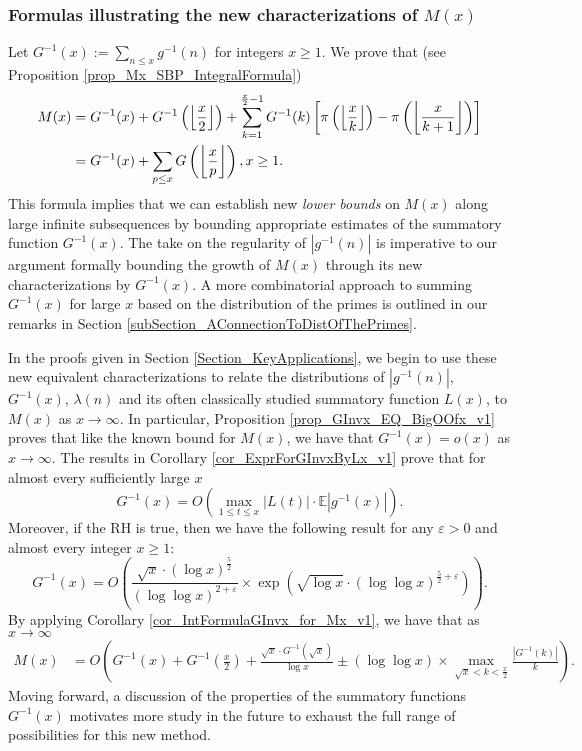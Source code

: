 \documentclass[11pt,reqno,a4letter]{article}
\numberwithin{figure}{section}
\numberwithin{table}{section}
\newcommand{\Floor}[2]{\ensuremath{\left\lfloor \frac{#1}{#2} \right\rfloor}}
\theoremstyle{plain}
\numberwithin{theorem}{section}
\theoremstyle{definition}
\begin{document}
\subsubsection{Formulas illustrating the new characterizations of $M(x)$} 

Let $G^{-1}(x) := \sum_{n \leq x} g^{-1}(n)$ for integers $x \geq 1$. 
We prove that (see Proposition \ref{prop_Mx_SBP_IntegralFormula}) 
\begin{align} 
\label{eqn_Mx_gInvnPixk_formula_v2} 
M(x) & = G^{-1}(x) + G^{-1}\left(\Floor{x}{2}\right) + 
     \sum_{k=1}^{\frac{x}{2}-1} G^{-1}(k) \left[ 
     \pi\left(\Floor{x}{k}\right) - \pi\left(\Floor{x}{k+1}\right) 
     \right] \\ 
\notag
     & = 
     G^{-1}(x) + \sum_{p \leq x} G\left(\Floor{x}{p}\right), x \geq 1. 
\end{align} 
This formula 
implies that we can establish new \emph{lower bounds} on $M(x)$ along large infinite subsequences 
by bounding appropriate estimates of the summatory function $G^{-1}(x)$. 
The take on the regularity of $|g^{-1}(n)|$ is imperative to our argument formally bounding the growth 
of $M(x)$ through its new characterizations by $G^{-1}(x)$. 
A more combinatorial approach to summing $G^{-1}(x)$ for large $x$ based on the distribution of the primes 
is outlined in our remarks in Section \ref{subSection_AConnectionToDistOfThePrimes}. 

In the proofs given in 
Section \ref{Section_KeyApplications}, 
we begin to use these new equivalent characterizations to relate the distributions of 
$|g^{-1}(n)|$, $G^{-1}(x)$, $\lambda(n)$ and its often classically studied summatory function $L(x)$, 
to $M(x)$ as $x \rightarrow \infty$. 
In particular, Proposition \ref{prop_GInvx_EQ_BigOOfx_v1} 
proves that like the known bound for $M(x)$, we have that $G^{-1}(x) = o(x)$ as $x \rightarrow \infty$. 
The results in 
Corollary \ref{cor_ExprForGInvxByLx_v1} prove that for almost every sufficiently large $x$ 
\[
G^{-1}(x) = O\left(\max_{1 \leq t \leq x} |L(t)| \cdot \mathbb{E}|g^{-1}(x)|\right). 
\]
Moreover, if the RH is true, then we have the following result for any 
$\varepsilon > 0$ and almost every integer $x \geq 1$: 
\[
G^{-1}(x) = O\left( 
     \frac{\sqrt{x} \cdot (\log x)^{\frac{5}{2}}}{(\log\log x)^{2 + \varepsilon}} \times 
     \exp\left(\sqrt{\log x} \cdot (\log\log x)^{\frac{5}{2} + \varepsilon}\right) 
     \right). 
\]
By applying Corollary \ref{cor_IntFormulaGInvx_for_Mx_v1}, 
we have that as $x \rightarrow \infty$ 
\begin{align*}
     M(x) & = O\left(G^{-1}(x) + G^{-1}\left(\frac{x}{2}\right) + 
     \frac{\sqrt{x} \cdot G^{-1}(\sqrt{x})}{\log x} \pm 
     (\log\log x) \times \max_{\sqrt{x} < k < \frac{x}{2}} 
     \frac{|G^{-1}(k)|}{k}\right). 
\end{align*} 
Moving forward, a discussion of the properties of the summatory functions 
$G^{-1}(x)$ motivates more study in the future to 
exhaust the full range of possibilities for this new method. 
\end{document}
